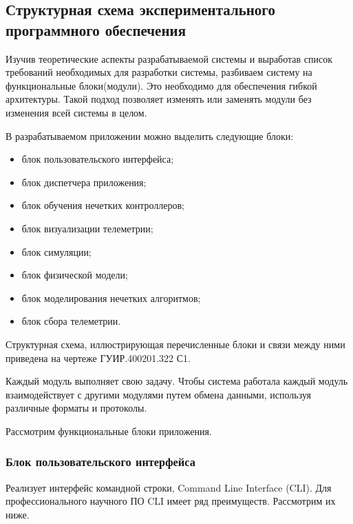\subsection{Структурная схема экспериментального программного обеспечения}
\label{sub:sys:4}

Изучив теоретические аспекты разрабатываемой системы и выработав список требований необходимых для разработки системы, разбиваем систему на функциональные блоки(модули). Это необходимо для обеспечения гибкой архитектуры. Такой подход позволяет изменять или заменять модули без изменения всей системы в целом.

В разрабатываемом приложении можно выделить следующие блоки:

\begin{itemize}
  \item блок пользовательского интерфейса;
  \item блок диспетчера приложения;
  \item блок обучения нечетких контроллеров;
  \item блок визуализации телеметрии;
  \item блок симуляции;
  \item блок физической модели;
  \item блок моделирования нечетких алгоритмов;
  \item блок сбора телеметрии.
\end{itemize}

Структурная схема, иллюстрирующая перечисленные блоки и связи между ними приведена на чертеже ГУИР.400201.322 С1.

Каждый модуль выполняет свою задачу. Чтобы система работала каждый модуль взаимодействует с другими модулями путем обмена данными, используя различные форматы и протоколы.

Рассмотрим функциональные блоки приложения.

\subsubsection{Блок пользовательского интерфейса}

Реализует интерфейс командной строки, Command Line Interface (CLI). Для профессионального научного ПО CLI имеет ряд преимуществ. Рассмотрим их ниже.

